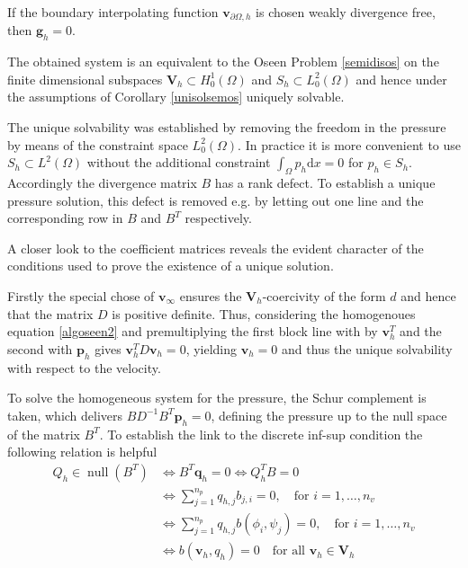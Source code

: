\documentclass[a4paper,10pt,BCOR=15mm]{scrbook}
\DeclareMathOperator{\nulli}{null}
\providecommand{\inva}[1]{\text{d} #1}
\begin{document}
If the boundary interpolating function $\mathbf v_{\partial \Omega ,h}$ is chosen weakly divergence free, then $\mathbf g_h =0$.


The obtained system is an equivalent to the Oseen Problem \ref{semidisos} on the finite dimensional subspaces $\mathbf V_h \subset H^1_0 (\Omega)$ and $S_h \subset L^2_0 (\Omega)$ and hence under the assumptions of Corollary \ref{unisolsemos} uniquely solvable. 

\begin{rem}
 The unique solvability was established by removing the freedom in the pressure by means of the constraint space $L^2_0 (\Omega)$. In practice it is more convenient to use $S_h \subset L^2(\Omega)$ without the additional constraint $\int_\Omega p_h \inva x = 0$ for $p_h \in S_h$. Accordingly the divergence matrix $B$ has a rank defect. To establish a unique pressure solution, this defect is removed e.g. by letting out one line and the corresponding row in $B$ and $B^T$ respectively.
\end{rem}


A closer look to the coefficient matrices reveals the evident character of the conditions used to prove the existence of a unique solution. 

Firstly the special chose of $\mathbf v_\infty$ ensures the $\mathbf V_h$-coercivity of the form $d$ and hence that the matrix $D$ is positive definite. Thus, considering the homogenoues equation \eqref{algoseen2} and premultiplying the first block line with by $\mathbf v_h^T$ and the second with $\mathbf p_h$ gives $\mathbf v_h^T D \mathbf v_h =0$, yielding $\mathbf v_h = 0$ and thus the unique solvability with respect to the velocity.

To solve the homogeneous system for the pressure, the Schur complement is taken, which delivers $BD^{-1}B^T \mathbf p_h = 0$, defining the pressure up to the null space of the matrix $B^T$. To establish the link to the discrete inf-sup condition the following relation is helpful 
\begin{equation*}
\begin{split}
  Q_h \in \nulli (B^T) &\Leftrightarrow B^T\mathbf  q_h =0 \Leftrightarrow  Q_h^T B =0 \\
&\Leftrightarrow \sum_{j=1}^{n_p} q_{h,j} b_{j,i} = 0, \quad \text{for  } i=1,\dots,n_v \\
&\Leftrightarrow  \sum_{j=1}^{n_p} q_{h,j} b(\phi_i,\psi_j)  = 0, \quad \text{for  } i=1,\dots,n_v \\
 &\Leftrightarrow  b(\mathbf v_h, q_h) = 0 \quad \text{for all  } \mathbf v_h \in \mathbf V_h
\end{split}
\end{equation*}
\end{document}

